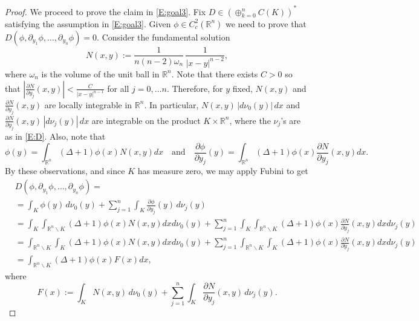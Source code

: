 \documentclass[11pt,reqno]{amsart}
\newcommand{\R}{{\mathbb R}}
\theoremstyle{definition}
\begin{document}
\begin{proof}
We proceed to prove the claim in \eqref{E:goal3}. Fix $D\in (\oplus_{k=0}^n C(K))^*$ satisfying the assumption in  \eqref{E:goal3}.  Given  $\phi \in C^2_c(\R^n)$ we need to prove that $D(\phi, \partial_{y_1} \phi, \dots,  \partial_{y_n} \phi ) =0$.  Consider the fundamental solution \[N(x,y):= \frac{1}{n(n-2)\omega_n} \,\frac{1}{|x-y|^{n-2}},\]
where $\omega_n$ is the volume of the unit ball in $\R^n$. 
Note that there exists $C > 0$ so that
$\left|\frac{\partial N}{\partial y_j}(x,y) \right|< \frac{C}{|x-y|^{n-1}}$ for all  $j =0,\dots n.$
Therefore, for $y$ fixed, $N(x,y)$ and $\frac{\partial N}{\partial y_j}(x,y)$ are locally integrable in $\R^n$.
In particular, $N(x,y)\,|d\nu_0(y)|\, dx$ and $\frac{\partial N}{\partial y_j}(x,y)\, |d\nu_j(y)| \,dx$ are integrable on the product $K\times\R^n$, where the $\nu_j$'s are as in \eqref{E:D}.
Also, note that 
\[
\phi(y) = \int_{\R^n} (\Delta+1)\phi(x) N(x,y) dx
\quad
\text{and}
\quad
\frac{\partial \phi}{\partial y_j}(y) = \int_{\R^n} (\Delta+1)\phi (x) \frac{\partial N}{\partial y_j}(x,y) dx.
\]
By these observations, and since $K$ has measure zero, we may apply Fubini to get
\begin{align*}
&D(\phi, \partial_{y_1} \phi, \dots,  \partial_{y_n} \phi ) =\\
&=\int_K \phi(y)\, d\nu_0(y) + \sum_{j=1}^n \int_K \frac{\partial \phi}{\partial y_j}(y)\, d\nu_j(y)\\
&\!=\int_K  \int_{\R^n \backslash K} (\Delta+1)\phi(x) N(x,y) dx d\nu_0(y) + \sum_{j=1}^n \int_K\int_{\R^n \backslash  K} (\Delta+1)\phi (x) \frac{\partial N}{\partial y_j}(x,y) dxd\nu_j(y)\\
&\!= \int_{\R^n \backslash K} \int_K (\Delta+1)\phi(x) N(x,y) dx d\nu_0(y) + \sum_{j=1}^n  \int_{\R^n \backslash K} \int_K (\Delta+1)\phi (x) \frac{\partial N}{\partial y_j}(x,y) dx d\nu_j(y)\\
&= \int_{\R^n\backslash K} (\Delta+1)\phi(x) F(x) dx,
\end{align*}
where 
\[F(x):=\int_K N(x,y)\, d\nu_0(y) + \sum_{j=1}^n \int_K \frac{\partial N}{\partial y_j}(x,y)\, d\nu_j(y).\]  


\end{proof}
\end{document}
